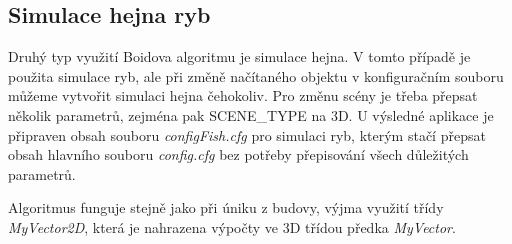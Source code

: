\documentclass[czech,public,dept460,male,cpdeclaration]{diploma}
\begin{document}
\newpage




\newpage

\subsection{Simulace hejna ryb}
Druhý typ využití Boidova algoritmu je simulace hejna. V tomto případě je použita simulace ryb, ale při změně načítaného objektu v konfiguračním souboru můžeme vytvořit simulaci hejna čehokoliv. Pro změnu scény je třeba přepsat několik parametrů, zejména pak SCENE\_TYPE na 3D. U výsledné aplikace je připraven obsah souboru \textit{configFish.cfg} pro simulaci ryb, kterým stačí přepsat obsah hlavního souboru \textit{config.cfg} bez potřeby přepisování všech důležitých parametrů.

Algoritmus funguje stejně jako při úniku z budovy, výjma využití třídy \textit{MyVector2D}, která je nahrazena výpočty ve 3D třídou předka \textit{MyVector}.
\end{document}

